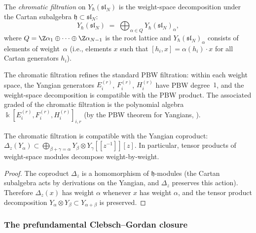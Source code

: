 \begin{definition}
The \emph{chromatic filtration} on $Y_\hbar(\mathfrak{sl}_N)$
is the weight-space decomposition under the Cartan
subalgebra $\mathfrak{h}\subset\mathfrak{sl}_N$:
\begin{equation}
Y_\hbar(\mathfrak{sl}_N)
\;=\;
\bigoplus_{\alpha\in Q}
Y_\hbar(\mathfrak{sl}_N)_\alpha,
\end{equation}
where $Q=\Z\alpha_1\oplus\cdots\oplus\Z\alpha_{N-1}$ is the
root lattice and $Y_\hbar(\mathfrak{sl}_N)_\alpha$ consists
of elements of weight~$\alpha$ (i.e., elements $x$ such
that $[h_i,x]=\alpha(h_i)\cdot x$ for all Cartan generators
$h_i$).

The chromatic filtration refines the standard PBW
filtration: within each weight space, the Yangian generators
$E_i^{(r)}$, $F_i^{(r)}$, $H_i^{(r)}$ have PBW degree~$1$,
and the weight-space decomposition is compatible with the
PBW product. The associated graded of the chromatic
filtration is the polynomial algebra
$\Bbbk[E_i^{(r)},F_i^{(r)},H_i^{(r)}]_{i,r}$
(by the PBW theorem for Yangians, \cite{CP94}).
\end{definition}

\begin{proposition}
The chromatic filtration is compatible with the
Yangian coproduct:
$\Delta_z(Y_\alpha)\subset
\bigoplus_{\beta+\gamma=\alpha}Y_\beta\otimes Y_\gamma
[\![z^{-1}]\!][z]$.
In particular, tensor products of weight-space modules
decompose weight-by-weight.
\end{proposition}

\begin{proof}
The coproduct $\Delta_z$ is a homomorphism of
$\mathfrak{h}$-modules (the Cartan subalgebra acts by
derivations on the Yangian, and $\Delta_z$ preserves
this action). Therefore
$\Delta_z(x)$ has weight $\alpha$ whenever $x$ has
weight $\alpha$, and the tensor product decomposition
$Y_\alpha\otimes Y_\beta\subset Y_{\alpha+\beta}$
is preserved.
\end{proof}

\subsubsection{The prefundamental Clebsch--Gordan closure}

